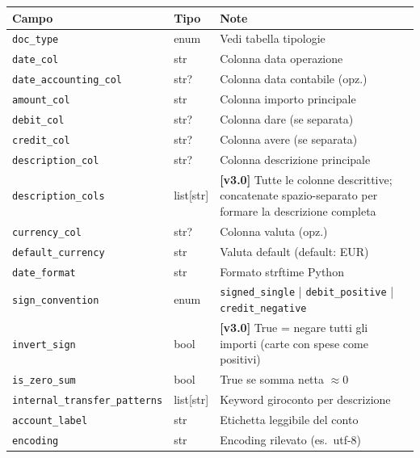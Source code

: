 \documentclass[11pt, a4paper]{article}
\begin{document}
\begin{center}
\small
\begin{longtable}{@{}L{4.5cm} L{2.5cm} L{6.5cm}@{}}
\toprule
\textbf{Campo} & \textbf{Tipo} & \textbf{Note} \\
\midrule
\endhead
\texttt{doc\_type}                & enum      & Vedi tabella tipologie \\
\texttt{date\_col}                & str       & Colonna data operazione \\
\texttt{date\_accounting\_col}    & str?      & Colonna data contabile (opz.) \\
\texttt{amount\_col}              & str       & Colonna importo principale \\
\texttt{debit\_col}               & str?      & Colonna dare (se separata) \\
\texttt{credit\_col}              & str?      & Colonna avere (se separata) \\
\texttt{description\_col}         & str?      & Colonna descrizione principale \\
\texttt{description\_cols}        & list[str] & \textbf{[v3.0]} Tutte le colonne descrittive;
                                               concatenate spazio-separato per formare la
                                               descrizione completa \\
\texttt{currency\_col}            & str?      & Colonna valuta (opz.) \\
\texttt{default\_currency}        & str       & Valuta default (default: EUR) \\
\texttt{date\_format}             & str       & Formato strftime Python \\
\texttt{sign\_convention}         & enum      & \texttt{signed\_single} | \texttt{debit\_positive} |
                                               \texttt{credit\_negative} \\
\texttt{invert\_sign}             & bool      & \textbf{[v3.0]} True = negare tutti gli importi
                                               (carte con spese come positivi) \\
\texttt{is\_zero\_sum}            & bool      & True se somma netta $\approx 0$ \\
\texttt{internal\_transfer\_patterns} & list[str] & Keyword giroconto per descrizione \\
\texttt{account\_label}           & str       & Etichetta leggibile del conto \\
\texttt{encoding}                 & str       & Encoding rilevato (es.\ utf-8) \\

\end{longtable}
\end{center}
\end{document}
